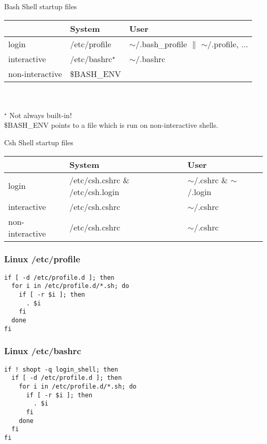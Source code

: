 \documentclass{beamer}
\begin{document}
\begin{frame}{Bash Shell startup files}
    \begin{tabular}{|l|l|l|}
        \hline
        ~           & System       & User \\\hline\hline
        login       & /etc/profile & $\sim$/.bash\_profile $\parallel$ $\sim$/.profile, ...\\\hline
        interactive & {\color{red}/etc/bashrc}$^\star$  & $\sim$/.bashrc\\\hline
        non-interactive & \$BASH\_ENV  & ~\\\hline
    \end{tabular}
    ~\\
    ~\\
    $^\star$ Not always built-in!\\
    \$BASH\_ENV points to a file which is run on  non-interactive shells.
\end{frame}

\begin{frame}{Csh Shell startup files}
{\small
    \begin{tabular}{|l|l|l|}
        \hline
        ~           & System       & User \\\hline\hline
        login       & /etc/csh.cshrc \& /etc/csh.login &  $\sim$/.cshrc  \& $\sim$/.login\\\hline
        interactive & /etc/csh.cshrc  & $\sim$/.cshrc\\\hline
        non-interactive & /etc/csh.cshrc & $\sim$/.cshrc~\\\hline
    \end{tabular}
}
\end{frame}

\begin{frame}[fragile]
    \frametitle{Linux /etc/profile}
    {
\begin{verbatim}
if [ -d /etc/profile.d ]; then
  for i in /etc/profile.d/*.sh; do
    if [ -r $i ]; then
      . $i
    fi
  done
fi
\end{verbatim}
    }
\end{frame}


\begin{frame}[fragile]
    \frametitle{Linux /etc/bashrc}
    {
\begin{verbatim}
if ! shopt -q login_shell; then
  if [ -d /etc/profile.d ]; then
    for i in /etc/profile.d/*.sh; do
      if [ -r $i ]; then
        . $i
      fi
    done
  fi
fi
\end{verbatim}
    }
\end{frame}
\end{document}
